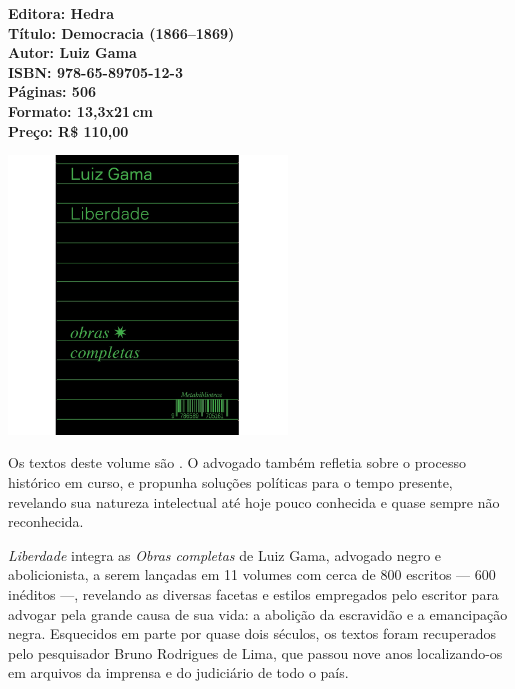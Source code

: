 \vfill
\noindent\begin{minipage}[c]{1\linewidth}
{\small\textbf{
\hspace*{-.1cm}Editora: Hedra\\
Título: Democracia (1866--1869)\\
Autor: Luiz Gama\\ 
ISBN: 978-65-89705-12-3\\
Páginas: 506\\
Formato: 13,3x21\,cm\\
Preço: R\$ 110,00\\
}}
\end{minipage}
\pagebreak

\begin{center}
\hspace*{.5cm}\includegraphics[width=74mm]{./CAPAS/liberdade.jpg}
\end{center}
\hspace*{-7cm}\hrulefill\hspace*{-7cm}
\medskip

\noindent{}Os textos deste volume são . O advogado também refletia sobre o processo histórico em curso, e propunha soluções políticas para o tempo presente, revelando sua natureza intelectual até hoje pouco conhecida e quase sempre não reconhecida.

\textit{Liberdade} integra as \textit{Obras completas} de Luiz Gama, advogado negro e abolicionista, a serem lançadas em 11 volumes com cerca de 800 escritos --- 600 inéditos ---, revelando as diversas facetas e estilos empregados pelo escritor para advogar pela grande causa de sua vida: a abolição da escravidão e a emancipação negra. Esquecidos em parte por quase dois séculos, os textos foram recuperados pelo pesquisador Bruno Rodrigues de Lima, que passou nove anos localizando-os em arquivos da imprensa e do judiciário de todo o país.


